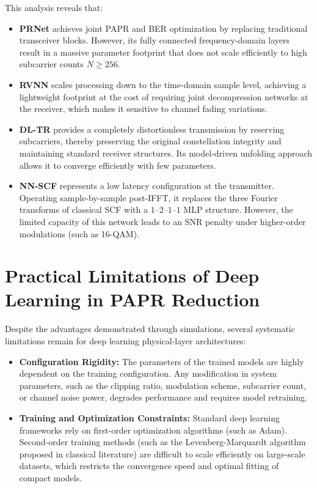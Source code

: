 This analysis reveals that:
\begin{itemize}
    \item \textbf{PRNet} achieves joint PAPR and BER optimization by replacing traditional transceiver blocks. However, its fully connected frequency-domain layers result in a massive parameter footprint that does not scale efficiently to high subcarrier counts $N \ge 256$.
    \item \textbf{RVNN} scales processing down to the time-domain sample level, achieving a lightweight footprint at the cost of requiring joint decompression networks at the receiver, which makes it sensitive to channel fading variations.
    \item \textbf{DL-TR} provides a completely distortionless transmission by reserving subcarriers, thereby preserving the original constellation integrity and maintaining standard receiver structures. Its model-driven unfolding approach allows it to converge efficiently with few parameters.
    \item \textbf{NN-SCF} represents a low latency configuration at the transmitter. Operating sample-by-sample post-IFFT, it replaces the three Fourier transforms of classical SCF with a $1\text{--}2\text{--}1\text{--}1$ MLP structure. However, the limited capacity of this network leads to an SNR penalty under higher-order modulations (such as 16-QAM).
\end{itemize}

\section{Practical Limitations of Deep Learning in PAPR Reduction}
\label{sec:conclusion_limitations}

Despite the advantages demonstrated through simulations, several systematic limitations remain for deep learning physical-layer architectures:

\begin{itemize}
    \item \textbf{Configuration Rigidity:} The parameters of the trained models are highly dependent on the training configuration. Any modification in system parameters, such as the clipping ratio, modulation scheme, subcarrier count, or channel noise power, degrades performance and requires model retraining.
    \item \textbf{Training and Optimization Constraints:} Standard deep learning frameworks rely on first-order optimization algorithms (such as Adam). Second-order training methods (such as the Levenberg-Marquardt algorithm proposed in classical literature) are difficult to scale efficiently on large-scale datasets, which restricts the convergence speed and optimal fitting of compact models.
\end{itemize}

